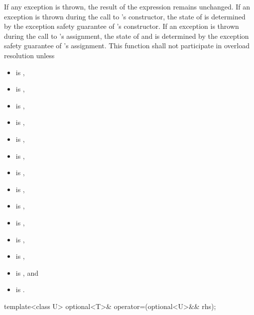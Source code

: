 \begin{itemdescr}
\pnum
\remarks
If any exception is thrown,
the result of the expression  remains unchanged.
If an exception is thrown during the call to 's constructor,
the state of  is determined by
the exception safety guarantee of 's constructor.
If an exception is thrown during the call to 's assignment,
the state of  and  is determined by
the exception safety guarantee of 's assignment.
This function shall not participate in overload resolution unless
\begin{itemize}
\item {} is ,
\item {} is ,
\item {} is ,
\item {} is ,
\item {} is ,
\item {} is ,
\item {} is ,
\item {} is ,
\item {} is ,
\item {} is ,
\item {} is ,
\item {} is ,
\item {} is , and
\item {} is .
\end{itemize}
\end{itemdescr}

%
\begin{itemdecl}
template<class U> optional<T>& operator=(optional<U>&& rhs);
\end{itemdecl}

